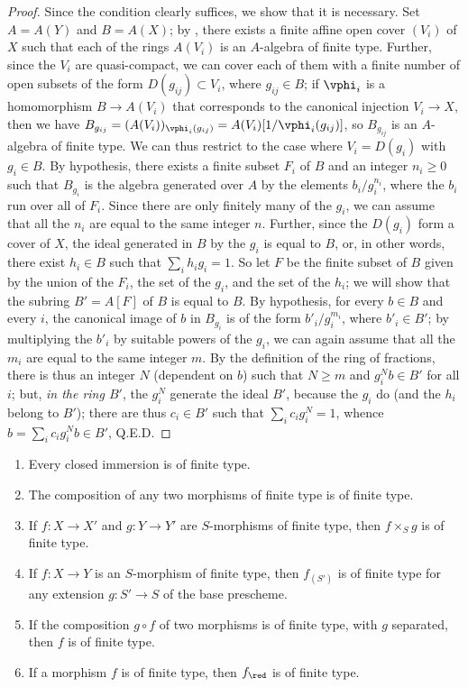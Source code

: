 \begin{proof}
Since the condition clearly suffices, we show that it is necessary.
Set $A=A(Y)$ and $B=A(X)$;
by , there exists a finite affine open cover $(V_i)$ of $X$ such that each of the rings $A(V_i)$ is an $A$-algebra of finite type.
Further, since the $V_i$ are quasi-compact, we can cover each of them with a finite number of open subsets of the form $D(g_{ij})\subset V_i$, where $g_{ij}\in B$;
if $\vphi_i$ is a homomorphism $B\to A(V_i)$ that corresponds to the canonical injection $V_i\to X$, then we have $B_{g_{ij}}=(A(V_i))_{\vphi_i(g_{ij})}=A(V_i)[1/\vphi_i(g_{ij})]$, so $B_{g_{ij}}$ is an $A$-algebra of finite type.
We can thus restrict to the case where $V_i=D(g_i)$ with $g_i\in B$.
By hypothesis, there exists a finite subset $F_i$ of $B$ and an integer $n_i\geq0$ such that $B_{g_i}$ is the algebra generated over $A$ by the elements $b_i/g_i^{n_i}$, where the $b_i$ run over all of $F_i$.
Since there are only finitely many of the $g_i$, we can assume that all the $n_i$ are equal to the same integer $n$.
Further, since the $D(g_i)$ form a cover of $X$, the ideal generated in $B$ by the $g_i$ is equal to $B$, or, in other words, there exist $h_i\in B$ such that $\sum_i h_ig_i=1$.
So let $F$ be the finite subset of $B$ given by the union of the $F_i$, the set of the $g_i$, and the set of the $h_i$; we will show that the subring $B'=A[F]$ of $B$ is equal to $B$.
By hypothesis, for every $b\in B$ and every $i$, the canonical image of $b$ in $B_{g_i}$ is of the form $b'_i/g_i^{m_i}$, where $b'_i\in B'$;
by multiplying the $b'_i$ by suitable powers of the $g_i$, we can again assume that all the $m_i$ are equal to the same integer $m$.
By the definition of the ring of fractions, there is thus an integer $N$ (dependent on $b$) such that $N\geq m$ and $g_i^Nb\in B'$ for all $i$;
but, \emph{in the ring $B'$}, the $g_i^N$ generate the ideal $B'$, because the $g_i$ do (and the $h_i$ belong to $B'$);
there are thus $c_i\in B'$ such that $\sum_i c_ig_i^N=1$, whence $b=\sum_ic_ig_i^Nb\in B'$, Q.E.D.
\end{proof}

\begin{proposition}[6.3.4]
\label{I.6.3.4}
\medskip\noindent
\begin{enumerate}
  \item[{\rm(i)}] Every closed immersion is of finite type.
  \item[{\rm(ii)}] The composition of any two morphisms of finite type is of finite type.
  \item[{\rm(iii)}] If $f:X\to X'$ and $g:Y\to Y'$ are $S$-morphisms of finite type, then $f\times_S g$ is of finite type.
  \item[{\rm(iv)}] If $f:X\to Y$ is an $S$-morphism of finite type, then $f_{(S')}$ is of finite type for any extension $g:S'\to S$ of the base prescheme.
  \item[{\rm(v)}] If the composition $g\circ f$ of two morphisms is of finite type, with $g$ separated, then $f$ is of finite type.
  \item[{\rm(vi)}] If a morphism $f$ is of finite type, then $f_\red$ is of finite type.
\end{enumerate}
\end{proposition}

